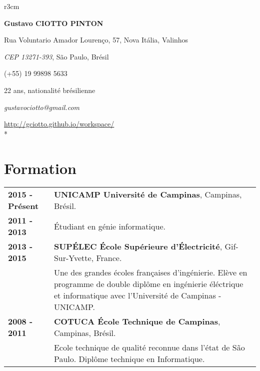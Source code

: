 \documentclass[10pt, a4paper]{article}
\author{Gustavo Ciotto Pinton}
\begin{document}
\pagestyle{empty} 

\begin{wrapfigure}{r}{3cm}
  \vspace{-20pt}
  \begin{center}
  \end{center}
\end{wrapfigure}

\textbf{\LARGE Gustavo CIOTTO PINTON}

Rua Voluntario Amador Lourenço, 57, Nova Itália, Valinhos

\textit{CEP 13271-393}, São Paulo, Brésil

(+55) 19 99898 5633

22 ans, nationalité brésilienne

\textit{gustavociotto@gmail.com} 

\url{http://gciotto.github.io/workspace/}\\*



\section{Formation}

\begin{tabular}{p{} p{}}

 \textbf{2015 - Présent} & \textbf{UNICAMP Université de Campinas}, Campinas,
 Brésil.
 \\
 \textbf{2011 - 2013} & Étudiant en génie informatique. \vspace{8pt}\\

 \textbf{2013 - 2015} & \textbf{SUPÉLEC  École Supérieure d'Électricité},
 Gif-Sur-Yvette, France. \\
 & Une des grandes écoles françaises d'ingénierie. Elève en programme de double
 diplôme en ingénierie éléctrique et informatique avec l'Université de Campinas
 - UNICAMP. \vspace{8pt}
 \\
  
 
 \textbf{2008 - 2011} & \textbf{COTUCA École Technique de Campinas}, Campinas, Brésil. \\ 
 & Ecole technique de qualité reconnue dans l’état de São Paulo. Diplôme
 technique en Informatique. \\
\end{tabular}
\end{document}
